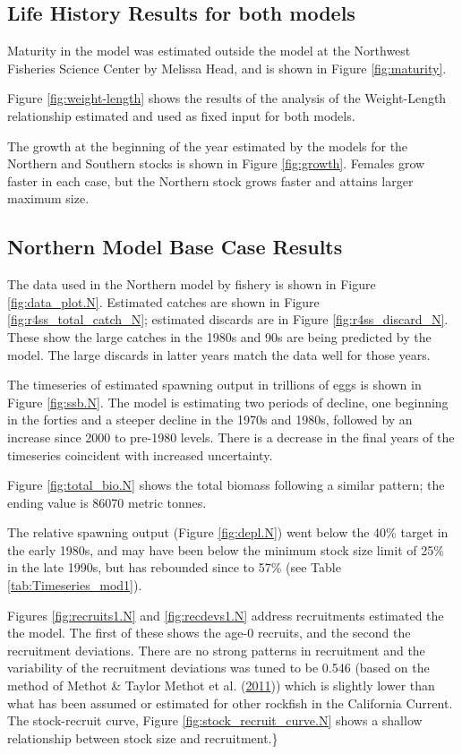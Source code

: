 \documentclass[12pt,]{article}
\begin{document}
\clearpage

\subsection{Life History Results for both
models}\label{life-history-results-for-both-models}

Maturity in the model was estimated outside the model at the Northwest
Fisheries Science Center by Melissa Head, and is shown in Figure
\ref{fig:maturity}.

Figure \ref{fig:weight-length} shows the results of the analysis of the
Weight-Length relationship estimated and used as fixed input for both
models.

The growth at the beginning of the year estimated by the models for the
Northern and Southern stocks is shown in Figure \ref{fig:growth}.
Females grow faster in each case, but the Northern stock grows faster
and attains larger maximum size.

\subsection{Northern Model Base Case
Results}\label{northern-model-base-case-results}

The data used in the Northern model by fishery is shown in Figure
\ref{fig:data_plot.N}. Estimated catches are shown in Figure
\ref{fig:r4ss_total_catch_N}; estimated discards are in Figure
\ref{fig:r4ss_discard_N}. These show the large catches in the 1980s and
90s are being predicted by the model. The large discards in latter years
match the data well for those years.

The timeseries of estimated spawning output in trillions of eggs is
shown in Figure \ref{fig:ssb.N}. The model is estimating two periods of
decline, one beginning in the forties and a steeper decline in the 1970s
and 1980s, followed by an increase since 2000 to pre-1980 levels. There
is a decrease in the final years of the timeseries coincident with
increased uncertainty.

Figure \ref{fig:total_bio.N} shows the total biomass following a similar
pattern; the ending value is 86070 metric tonnes.

The relative spawning output (Figure \ref{fig:depl.N}) went below the
40\% target in the early 1980s, and may have been below the minimum
stock size limit of 25\% in the late 1990s, but has rebounded since to
57\% (see Table \ref{tab:Timeseries_mod1}).

Figures \ref{fig:recruits1.N} and \ref{fig:recdevs1.N} address
recruitments estimated the the model. The first of these shows the age-0
recruits, and the second the recruitment deviations. There are no strong
patterns in recruitment and the variability of the recruitment
deviations was tuned to be 0.546 (based on the method of Methot \&
Taylor Methot et al. (\protect\hyperlink{ref-Methot2011}{2011})) which
is slightly lower than what has been assumed or estimated for other
rockfish in the California Current. The stock-recruit curve, Figure
\ref{fig:stock_recruit_curve.N} shows a shallow relationship between
stock size and recruitment.\}
\end{document}
